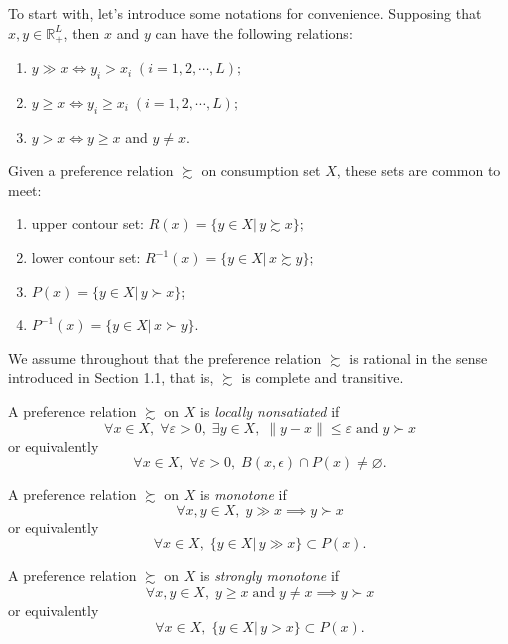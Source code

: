 \documentclass[12pt,fleqn]{book} %
\begin{document}
To start with, let's introduce some notations for convenience.
Supposing that $x,y\in\mathbb{R}_+^L$, then $x$ and $y$ can have the following relations:
\begin{enumerate}
	\item $y\gg x \Longleftrightarrow y_i>x_i\;(i=1,2,\cdots,L);$
	\item $y\geqslant x \Longleftrightarrow y_i\geqslant x_i\;(i=1,2,\cdots,L);$
	\item $y>x\Longleftrightarrow y\geqslant x$ and $y\ne x.$
\end{enumerate}

Given a preference relation $\succsim$ on consumption set $X$, these sets are common to meet:
\begin{enumerate}
	\item upper contour set: $R(x)=\{y\in X|\,y\succsim x\};$
	\item lower contour set: $R^{-1}(x)=\{y\in X|\,x\succsim y\};$
	\item $P(x)=\{y\in X|\,y\succ x\}$;
	\item $P^{-1}(x)=\{y\in X|\,x\succ y\}$.
\end{enumerate}

We assume throughout that the preference relation $\succsim$ is rational in the sense introduced in Section 1.1, that is, $\succsim$ is complete and transitive.

\begin{definition}
	A preference relation $\succsim$ on $X$ is \emph{locally nonsatiated} if
	\[
	\forall x\in X,\;\forall \varepsilon>0,\;\exists y\in X,\;\|y-x\|\le\varepsilon\;\text{and}\;y\succ x
	\]
	or equivalently
	\[
	\forall x\in X,\;\forall \varepsilon>0,\;B(x,\epsilon)\cap P(x)\ne\varnothing.
	\]
\end{definition}

\begin{definition}[Monotonicity]
	A preference relation $\succsim$ on $X$ is \emph{monotone} if
	\[
	\forall x,y\in X,\;y\gg x\implies y\succ x
	\]
	or equivalently
	\[
	\forall x\in X,\;\{y\in X|\,y\gg x\}\subset P(x).
	\]
\end{definition}

\begin{definition}
	A preference relation $\succsim$ on $X$ is \emph{strongly monotone} if
	\[
	\forall x,y\in X,\;y\geqslant x\;\text{and}\;y\ne x\implies y\succ x
	\]
	or equivalently
	\[
	\forall x\in X,\;\{y\in X|\,y> x\}\subset P(x).
	\]
\end{definition}
\end{document}

